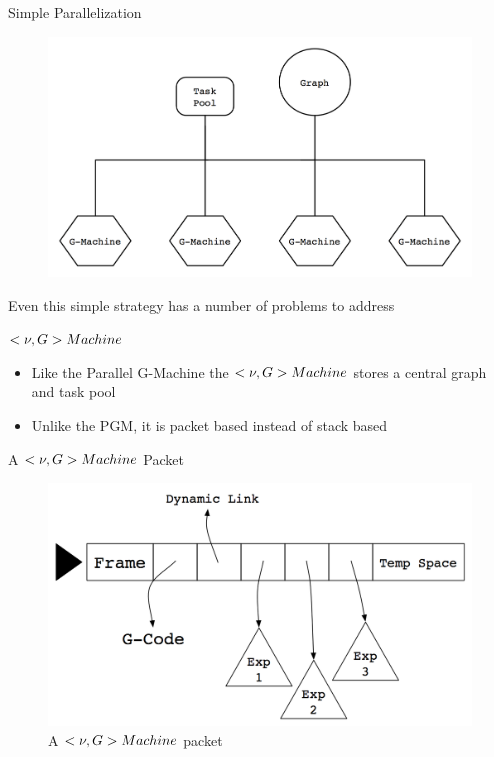 \documentclass{beamer}
\begin{document}
\begin{frame}{Simple Parallelization}
    \begin{figure}
    \centering
        \includegraphics[scale=.3]{figures/simpleParallel.png}
    \end{figure}

\pause
Even this simple strategy has a number of problems to address
\end{frame}

\begin{frame}{$<\nu, G>\-Machine$ \citep{vGMachine}}
\begin{itemize}
    \item
        Like the Parallel G-Machine the $<\nu, G>\-Machine$ stores a central graph and task pool
    \item
\pause
        Unlike the PGM, it is packet based instead of stack based
\end{itemize}
\end{frame}

\begin{frame}{A $<\nu, G>\-Machine$ Packet}

    \begin{figure}
    \centering
        \includegraphics[scale=.3]{figures/packet.png}
        \caption{A $<\nu, G>\-Machine$ packet}
    \end{figure}
\end{frame}
\end{document}
